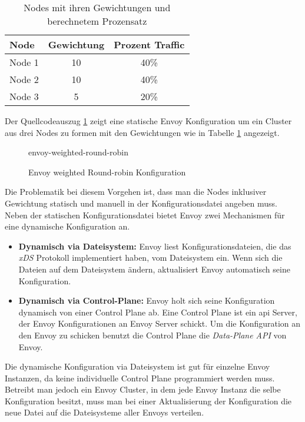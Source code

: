 \begin{table}[h!]
\centering
\renewcommand{\arraystretch}{1.5}
\begin{tabular}{|l|c|c|}
    \hline
    \textbf{Node} & \textbf{Gewichtung} & \textbf{Prozent Traffic} \\
    \hline
    \hline
    Node 1 & 10 & 40\% \\
    \hline
    Node 2 & 10 & 40\% \\
    \hline
    Node 3 & 5 & 20\% \\
    \hline
\end{tabular}
\caption{Nodes mit ihren Gewichtungen und berechnetem Prozensatz}
\label{table:example-cluster-weight}
\end{table}
Der Quellcodeauszug \ref{code:envoy-cluster-weight} zeigt eine statische Envoy Konfiguration um ein Cluster aus drei Nodes zu formen mit den Gewichtungen wie in Tabelle \ref{table:example-cluster-weight} angezeigt.
\begin{figure}
    {envoy-weighted-round-robin}
    \caption{Envoy weighted Round-robin Konfiguration}
    \label{code:envoy-cluster-weight}
\end{figure}
Die Problematik bei diesem Vorgehen ist, dass man die Nodes inklusiver Gewichtung statisch und manuell in der Konfigurationsdatei angeben muss.
Neben der statischen Konfigurationsdatei bietet Envoy zwei Mechanismen für eine dynamische Konfiguration an.
\begin{itemize}
  \item \textbf{Dynamisch via Dateisystem:} Envoy liest Konfigurationsdateien, die das \textit{xDS} Protokoll implementiert haben, vom Dateisystem ein. Wenn sich die Dateien auf dem Dateisystem ändern, aktualisiert Envoy automatisch seine Konfiguration.
    \cite{ConfigurationDynamicFilesystem}
  \item \textbf{Dynamisch via Control-Plane:} Envoy holt sich seine Konfiguration dynamisch von einer Control Plane ab. Eine Control Plane ist ein \ac{api} Server, der Envoy Konfigurationen an Envoy Server schickt. Um die Konfiguration an den Envoy zu schicken benutzt die Control Plane die \textit{Data-Plane API}\cite{EnvoyproxyDataplaneapi2021} von Envoy.
    \cite{ConfigurationDynamicControl}
\end{itemize}
Die dynamische Konfiguration via Dateisystem ist gut für einzelne Envoy Instanzen, da keine individuelle Control Plane programmiert werden muss. Betreibt man jedoch ein Envoy Cluster, in dem jede Envoy Instanz die selbe Konfiguration besitzt, muss man bei einer Aktualisierung der Konfiguration die neue Datei auf die Dateisysteme aller Envoys verteilen.
